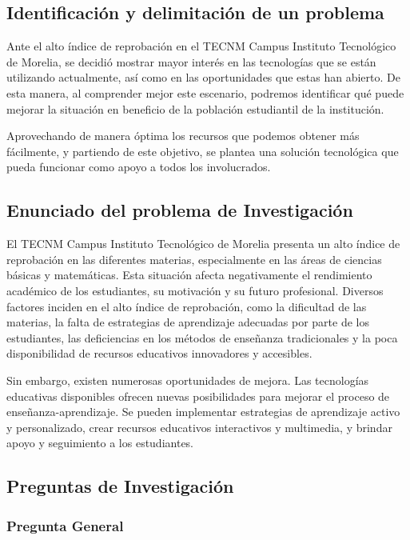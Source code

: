 \documentclass{article}
\begin{document}
\subsection{Identificación y delimitación de un problema}
Ante el alto índice de reprobación en el TECNM Campus Instituto Tecnológico de Morelia,
 se decidió mostrar mayor interés en las tecnologías que se están utilizando actualmente, así como en las
  oportunidades que estas han abierto. De esta manera, al comprender mejor este escenario, podremos identificar
   qué puede mejorar la situación en beneficio de la población estudiantil de la institución.

Aprovechando de manera óptima los recursos que podemos obtener más fácilmente, y partiendo de este objetivo, 
se plantea una solución tecnológica que pueda funcionar como apoyo a todos los involucrados. 

\subsection{Enunciado del problema de Investigación}

El TECNM Campus Instituto Tecnológico de Morelia presenta un alto índice de reprobación en las diferentes materias,
 especialmente en las áreas de ciencias básicas y matemáticas. Esta situación afecta negativamente el rendimiento académico
  de los estudiantes, su motivación y su futuro profesional.
  Diversos factores inciden en el alto índice de reprobación, como la dificultad de las materias, la falta de estrategias de
   aprendizaje adecuadas por parte de los estudiantes, las deficiencias en los métodos de enseñanza tradicionales y la poca
    disponibilidad de recursos educativos innovadores y accesibles.

Sin embargo, existen numerosas oportunidades de mejora. Las tecnologías educativas disponibles ofrecen nuevas posibilidades
 para mejorar el proceso de enseñanza-aprendizaje. Se pueden implementar estrategias de aprendizaje activo y personalizado, 
 crear recursos educativos interactivos y multimedia, y brindar apoyo y seguimiento a los estudiantes.

\subsection{Preguntas de Investigación}
    \subsubsection{Pregunta General}
    
\end{document}
